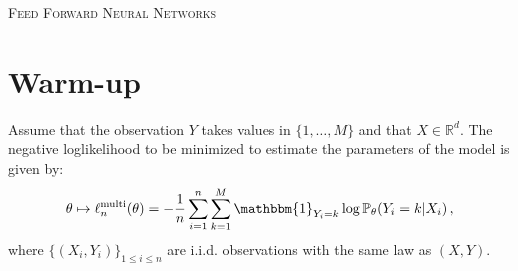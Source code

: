 \documentclass[a4paper,10pt,fleqn]{article}
\newcommand{\1}{\ensuremath{\mathbbm{1}}}
\begin{document}

\noindent\hrulefill

\begin{center}
\textsc{Feed Forward Neural Networks}
\end{center}
\hrulefill

\medskip



\section*{Warm-up}
Assume that the observation $Y$ takes values in $\{1,\ldots,M\}$ and that $X\in\mathbb{R}^d$. The negative loglikelihood to be minimized to estimate the parameters of the model is given by:
$$
\theta \mapsto \ell^{\mathrm{multi}}_n(\theta)= -\frac{1}{n} \sum_{i=1}^n\sum_{k=1}^{M} \1_{Y_i=k}\log \mathbb{P}_{\theta}(Y_i = k | X_i)\,,
$$
where $\{(X_i,Y_i)\}_{1\leqslant i\leqslant n}$ are i.i.d. observations with the same law as $(X,Y)$. 
\end{document}
